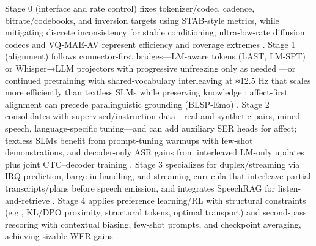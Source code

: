 Stage 0 (interface and rate control) fixes tokenizer/codec, cadence, bitrate/codebooks, and inversion targets using STAB-style metrics, while mitigating discrete inconsistency for stable conditioning; ultra‑low‑rate diffusion codecs and VQ‑MAE‑AV represent efficiency and coverage extremes \cite{vashishth2024stabspeechtokenizerassessmentbenchmark,liu2024analyzingmitigatinginconsistencydiscrete,wang2025tadicodectextawarediffusionspeechtokeniz,sadok2025vectorquantizedmaskedautoencoderaudiovis}. Stage 1 (alignment) follows connector-first bridges—LM-aware tokens (LAST, LM‑SPT) or Whisper→LLM projectors with progressive unfreezing only as needed \cite{turetzky2024lastlanguagemodelawarespeechtokenization,jo2025lmsptalignedsemanticdistillationspeechto,nguyen2025qwenvsgemmaintegrationwhispercomparative}—or continued pretraining with shared-vocabulary interleaving at ≈12.5 Hz that scales more efficiently than textless SLMs while preserving knowledge \cite{zeng2024scalingspeechtextpretrainingsyntheticint,maimon2025scalinganalysisinterleavedspeechtextlang,hassid2024textuallypretrainedspeechlanguagemodels,nachmani2024spokenquestionansweringspeechcontinuatio}; affect-first alignment can precede paralinguistic grounding (BLSP‑Emo) \cite{wang2024blspemotowardsempatheticlargespeechlangu}. Stage 2 consolidates with supervised/instruction data—real and synthetic pairs, mined speech, language-specific tuning—and can add auxiliary SER heads for affect; textless SLMs benefit from prompt‑tuning warmups with few-shot demonstrations, and decoder-only ASR gains from interleaved LM-only updates plus joint CTC–decoder training \cite{entry2025indicsuperbspeechprocessinguniversalperf,noroozi2024instructiondatagenerationunsupervisedada,lu2025desta2developinginstructionfollowingspee,wang2024blspemotowardsempatheticlargespeechlangu,hsu2024exploringcontextlearningtextlessspeechla,tsunoo2024decoderonlyarchitecturespeechrecognition}. Stage 3 specializes for duplex/streaming via IRQ prediction, barge‑in handling, and streaming curricula that interleave partial transcripts/plans before speech emission, and integrates SpeechRAG for listen-and-retrieve \cite{ma2024languagemodelcanlistenwhilespeaking,zeng2024scalingspeechtextpretrainingsyntheticint,min2025speechretrievalaugmentedgenerationwithou}. Stage 4 applies preference learning/RL with structural constraints (e.g., KL/DPO proximity, structural tokens, optimal transport) and second‑pass rescoring with contextual biasing, few‑shot prompts, and checkpoint averaging, achieving sizable WER gains \cite{li2025seewossubmissionmlcslmlessonslearnedspee,xu2025optimaltransportregularizationspeechtext,sun2023contextualbiasingnamedentitieslargelangu}.

